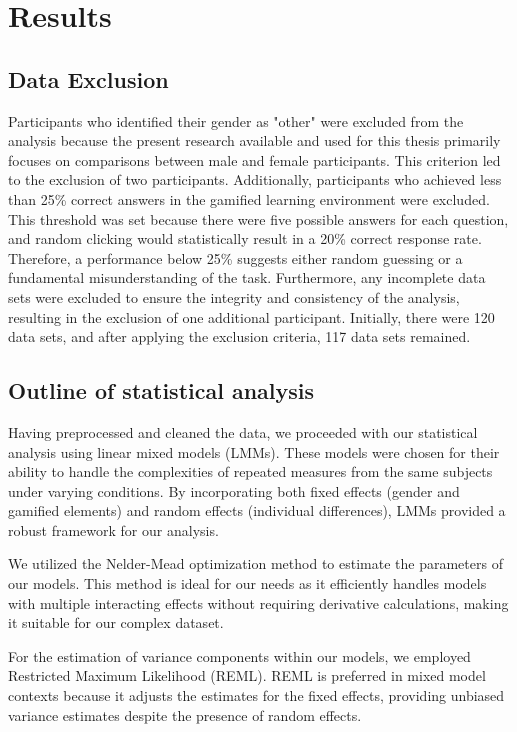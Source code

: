 
\section{Results}
\label{chap:evaluation}
\subsection{Data Exclusion}
Participants who identified their gender as "other" were excluded from the analysis because the present research available and used for this thesis primarily focuses on comparisons between male and female participants.
This criterion led to the exclusion of two participants. Additionally, participants who achieved less than 25\% correct answers in the gamified learning environment were excluded.
This threshold was set because there were five possible answers for each question, and random clicking would statistically result in a 20\% correct response rate.
Therefore, a performance below 25\% suggests either random guessing or a fundamental misunderstanding of the task.
Furthermore, any incomplete data sets were excluded to ensure the integrity and consistency of the analysis, resulting in the exclusion of one additional participant.
Initially, there were 120 data sets, and after applying the exclusion criteria, 117 data sets remained.

\subsection{Outline of statistical analysis}
Having preprocessed and cleaned the data, we proceeded with our statistical analysis using linear mixed models (LMMs).
These models were chosen for their ability to handle the complexities of repeated measures from the same subjects under varying conditions.
By incorporating both fixed effects (gender and gamified elements) and random effects (individual differences), LMMs provided a robust framework for our analysis.

We utilized the Nelder-Mead optimization method to estimate the parameters of our models.
This method is ideal for our needs as it efficiently handles models with multiple interacting effects without requiring derivative calculations, making it suitable for our complex dataset.

For the estimation of variance components within our models, we employed Restricted Maximum Likelihood (REML).
REML is preferred in mixed model contexts because it adjusts the estimates for the fixed effects, providing unbiased variance estimates despite the presence of random effects.

